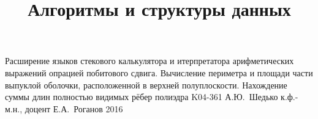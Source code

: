 \documentclass[a4paper,12pt]{memoir}
\def\+{\hskip 0.15mm}
\begin{document}
\renewcommand{\contentsname}{{\Large{Содержание}\hfill}}

\title{Алгоритмы и структуры данных}
{Расширение языков стекового калькулятора и итерпретатора арифметических
выражений опрацией побитового сдвига.
Вычисление периметра и площади части выпуклой оболочки, расположенной в
верхней полуплоскости. Нахождение суммы длин полностью видимых рёбер полиэдра}
{K04-361}
{А.\+Ю.~Шедько}
{к.ф.-м.н., доцент}
{Е.\+А.~Роганов}
{2016}


%





\newpage
%
%
\end{document}
